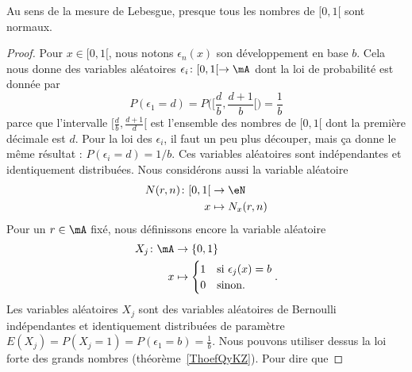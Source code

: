 \begin{proposition}     \label{PropEEOXLae}
	Au sens de la mesure de Lebesgue, presque tous les nombres de \( \mathopen[ 0 , 1 [\) sont normaux.
\end{proposition}

\begin{proof}
	Pour \( x\in\mathopen[ 0 , 1 [\), nous notons \( \epsilon_n(x)\) son développement en base \( b\). Cela nous donne des variables aléatoires \( \epsilon_i\colon \mathopen[ 0 , 1 [\to \mA\) dont la loi de probabilité est donnée par
	\begin{equation}
		P(\epsilon_1=d)=P\big( \mathopen[ \frac{ d }{ b } , \frac{ d+1 }{ b } [ \big)=\frac{1}{ b }
	\end{equation}
	parce que l'intervalle \( \mathopen[ \frac{ d }{ b } , \frac{ d+1 }{ d } [\) est l'ensemble des nombres de \( \mathopen[ 0 , 1 [\) dont la première décimale est \( d\). Pour la loi des \( \epsilon_i\), il faut un peu plus découper, mais ça donne le même résultat : \( P(\epsilon_i=d)=1/b\). Ces variables aléatoires sont indépendantes et identiquement distribuées. Nous considérons aussi la variable aléatoire
	\begin{equation}
		\begin{aligned}
			N(r,n)\colon \mathopen[ 0 , 1 [ & \to \eN          \\
			x                               & \mapsto N_x(r,n)
		\end{aligned}
	\end{equation}
	Pour un \( r\in\mA\) fixé, nous définissons encore la variable aléatoire
	\begin{equation}
		\begin{aligned}
			X_j\colon \mA & \to \{ 0,1 \}                      \\
			x             & \mapsto \begin{cases}
				1 & \text{si } \epsilon_j(x)=b \\
				0 & \text{sinon.}
			\end{cases}.
		\end{aligned}
	\end{equation}
	Les variables aléatoires \( X_j\) sont des variables aléatoires de Bernoulli indépendantes et identiquement distribuées de paramètre \( E(X_j)=P(X_j=1)=P(\epsilon_1=b)=\frac{1}{ b }\). Nous pouvons utiliser dessus la loi forte des grands nombres (théorème~\ref{ThoefQyKZ}). Pour dire que

\end{proof}
